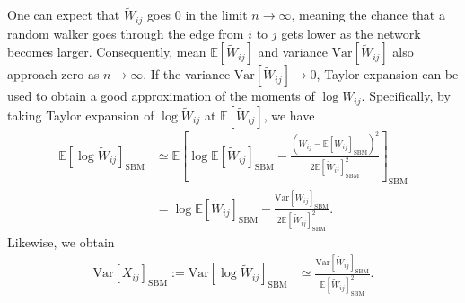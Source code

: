 \documentclass[12pt]{article} %
\def\Exp{{\mathbb E}}
\def\Var{\text{Var}}
\begin{document}
One can expect that $\tilde W_{ij}$ goes $0$ in the limit $n \rightarrow \infty$, meaning the chance that a random walker goes through the edge from $i$ to $j$ gets lower as the network becomes larger.
Consequently, mean $\Exp[\tilde W_{ij}]$ and variance $\Var[\tilde W_{ij}]$ also approach zero as $n\rightarrow \infty$.
If the variance $\Var[\tilde W_{ij}] \rightarrow 0$, Taylor expansion can be used to obtain a good approximation of the moments of $\log W_{ij}$.
Specifically, by taking Taylor expansion of $\log \tilde W_{ij}$ at $\Exp[\tilde W_{ij}]$, we have
\begin{align}
\Exp\left[ \log \tilde W_{ij}\right]_{\text{SBM}} & \simeq \Exp\left[ \log \Exp\left[ \tilde W_{ij}\right]_{\text{SBM}} -\frac{\left(\tilde W_{ij}-\Exp\left[ \tilde W_{ij}\right]_{\text{SBM}}\right)^2}{2\Exp\left[ \tilde W_{ij}\right]^2 _{\text{SBM}}} \right]_{\text{SBM}} \nonumber \\
                                     & = \log \Exp\left[ \tilde W_{ij}\right]_{\text{SBM}} -\frac{\Var\left[\tilde W_{ij}\right]_{\text{SBM}}}{2\Exp\left[ \tilde W_{ij}\right]^2 _{\text{SBM}}}.
\end{align}
Likewise, we obtain
\begin{align}
    \label{eq:varxij}
    \Var\left[ X_{ij}\right]_{\text{SBM}}:=\Var\left[ \log \tilde W_{ij}\right]_{\text{SBM}} & \simeq \frac{\Var\left[\tilde W_{ij}\right]_{\text{SBM}}}{\Exp\left[ \tilde W_{ij}\right]^2 _{\text{SBM}}}.
\end{align}
\end{document}
